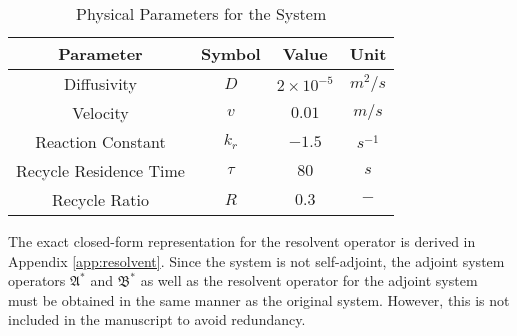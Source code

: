 \begin{table}[ht]
    \centering
    \caption{Physical Parameters for the System}
    \label{tab:pars}
    \begin{tabular}{|c|c|c|c|}
    \hline
    \textbf{Parameter}        & \textbf{Symbol} & \textbf{Value}     & \textbf{Unit}    \\ \hline
    Diffusivity               & $D$             & $2\times10^{-5}$   & ${m^2}/{s}$      \\ \hline
    Velocity                  & $v$             & $0.01$   & ${m}/{s}$        \\ \hline
    Reaction Constant         & $k_r$           & $-1.5$              & $s^{-1}$         \\ \hline
    Recycle Residence Time    & $\tau$          & $80$               & $s$              \\ \hline
    Recycle Ratio             & $R$             & $0.3$              & $-$              \\ \hline
    \end{tabular}
\end{table}

The exact closed-form representation for the resolvent operator is derived in Appendix \ref{app:resolvent}. Since the system is not self-adjoint, the adjoint system operators $\mathfrak{A}^*$ and $\mathfrak{B}^*$ as well as the resolvent operator for the adjoint system must be obtained in the same manner as the original system. However, this is not included in the manuscript to avoid redundancy.